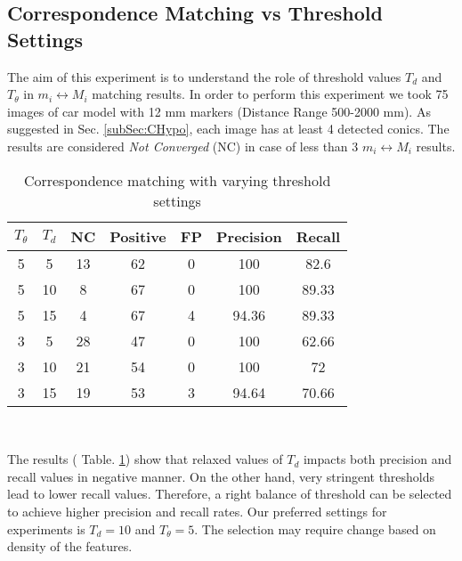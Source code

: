 \documentclass{bmvc2k}
\begin{document}
\subsection{Correspondence Matching vs Threshold Settings}
The aim of this experiment is to understand the role of threshold values $ T_{d}$ and $ T_\theta $ in $ m_i \leftrightarrow M_i $ matching results. 
In order to perform this experiment we took 75 images of car model with 12 mm markers (Distance Range 500-2000 mm). 
As suggested in Sec. \ref{subSec:CHypo}, each image has at least 4 detected conics. 
The results are considered \textit{Not Converged} (NC) in case of less than 3 $ m_i \leftrightarrow M_i $ results.

\begin{table}[tb]
\centering
\caption{Correspondence matching with varying threshold settings } \label{table:ThresholdEffect}
\begin{tabular}{ | c | c | c | c | c | c| c |}
\hline
$ T_\theta $ & $ T_{d} $ & NC & Positive & FP & Precision & Recall \\ \hline
5 & 5  & 13 & 62 & 0 & 100 & 82.6 \\
5 & 10 & 8 & 67 & 0 & 100 & 89.33\\
5 & 15 & 4 & 67  & 4 & 94.36 & 89.33\\ \hline
3 & 5  & 28 & 47  & 0 & 100 & 62.66 \\
3 & 10 & 21 & 54  & 0 & 100 & 72 \\
3 & 15 & 19 & 53  & 3 & 94.64 & 70.66 \\ \hline
\end{tabular} \\
\label{tab:Exp2}
\end{table}

\par 
The results ( Table. \ref{tab:Exp2}) show that relaxed values of $ T_{d} $ impacts both precision and recall values in negative manner. 
On the other hand, very stringent thresholds lead to lower recall values. Therefore, a right balance of threshold can be selected to achieve higher precision and recall rates. Our preferred settings for experiments is $ T_{d} = 10 $ and $ T_\theta = 5 $. The selection may require change based on density of the features. 
\end{document}
